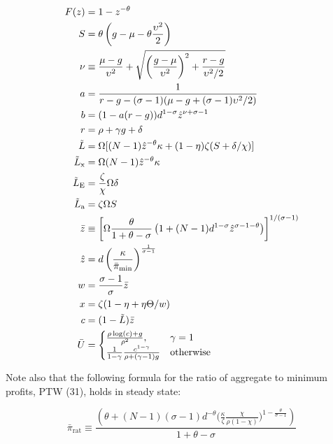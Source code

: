 \documentclass[11pt]{article}
\begin{document}
\begin{align}
	F(z) &= 1 - z^{-\theta} \\
	S &= \theta \left(g - \mu - \theta \frac{\upsilon^2}{2}\right) \\
	\nu &\equiv  \frac{\mu- g}{\upsilon^2} + \sqrt{\left(\frac{g-\mu}{\upsilon^2} \right)^{2} + \frac{r-g}{\upsilon^2/2}}\\
	a &= \frac{1}{r - g - (\sigma - 1)(\mu - g  + (\sigma - 1)\upsilon^2/2)} \\
	b &= (1 - a(r-g))d^{1-\sigma}\hat{z}^{\nu + \sigma -1} \\
	r &= \rho + \gamma g + \delta \\
	\tilde{L} &= \Omega [(N-1)\hat{z}^{-\theta}\kappa + (1-\eta)\zeta(S + \delta/\chi)] \\
	\tilde{L}_{\text{x}} &= \Omega (N -1)\hat{z}^{-\theta}\kappa\\
	\tilde{L}_{\text{E}} &= \frac{\zeta}{\chi}\Omega\delta\\
	\tilde{L}_{\text{a}} &= \zeta \Omega S\\
	\bar{z}&\equiv \left[\Omega
	\frac{\theta}{1+\theta - \sigma}\left(1 + (N-1)d^{1-\sigma}\hat{z}^{\sigma - 1 -\theta} \right)\right]^{1/(\sigma - 1)} \\
	\hat{z} &= d \left(\frac{\kappa}{\bar{\pi}_{\textup{min}}}\right)^{\frac{1}{\sigma - 1}} \\
	w &= \frac{\sigma - 1}{\sigma}\bar{z} \\
	x &= \zeta(1 - \eta + \eta \Theta / w) \\
		c &= (1 - \tilde{L})\bar{z} \\
		\bar{U} &=
	\begin{cases}
	\frac{\rho \log(c) + g}{\rho^2}, & \gamma = 1 \\
	\frac{1}{1-\gamma} \frac{c^{1 - \gamma}}{\rho + (\gamma - 1)g} & \text{otherwise}
	\end{cases}
\end{align}

Note also that the following formula for the ratio of aggregate to minimum profits, PTW (31), holds in steady state:

\begin{equation}
	\bar{\pi}_{\text{rat}} \equiv \frac{\left(\theta + (N-1)(\sigma-1)d^{-\theta}\big(\frac{\kappa}{\zeta} \frac{\chi}{\rho (1-\chi)}\big)^{1 - \frac{\theta}{\sigma - 1}}\right)}{1 + \theta - \sigma}
\end{equation}
\end{document}
